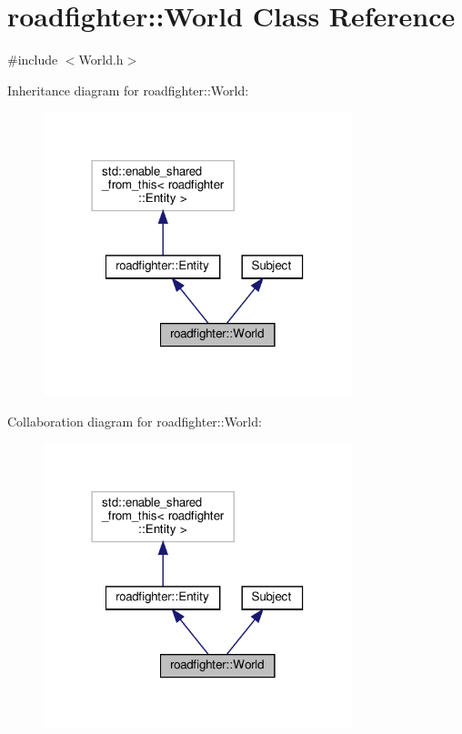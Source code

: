 \hypertarget{classroadfighter_1_1World}{}\section{roadfighter\+:\+:World Class Reference}
\label{classroadfighter_1_1World}


{\ttfamily \#include $<$World.\+h$>$}



Inheritance diagram for roadfighter\+:\+:World\+:\nopagebreak
\begin{figure}[H]
\begin{center}
\leavevmode
\includegraphics[width=254pt]{classroadfighter_1_1World__inherit__graph}
\end{center}
\end{figure}


Collaboration diagram for roadfighter\+:\+:World\+:\nopagebreak
\begin{figure}[H]
\begin{center}
\leavevmode
\includegraphics[width=254pt]{classroadfighter_1_1World__coll__graph}
\end{center}
\end{figure}

